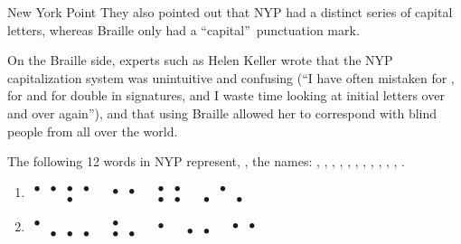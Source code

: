 \begin{refsection}
\begin{problem}{New York Point}{\namePLittell}{}
\noindent They also pointed out that NYP had a distinct series of capital letters, whereas Braille only had a “capital”\ punctuation mark. 

On the Braille side, experts such as Helen Keller wrote that the NYP capitalization system was unintuitive and confusing (“I have often mistaken  for ,  for  and  for double  in signatures, and I waste time looking at initial letters over and over again”), and that using Braille allowed her to correspond with blind people from all over the world.

The following 12 words in NYP represent, \OlympiadRandomOrder{}, the names: , , , , , , , , , , , . \\

\begin{multicols}{2}
\begin{enumerate}
    \item {\Large \boldmath$\begin{smallmatrix} 
    \bullet & \bullet & \bullet & \bullet \\  & & \bullet &
\end{smallmatrix}$\ \ $\begin{smallmatrix}
  \bullet & \bullet \\  & 
\end{smallmatrix}$\ \ $\begin{smallmatrix}
  \bullet & \bullet \\ \bullet & \bullet
\end{smallmatrix}$\ \ $\begin{smallmatrix}
  & \bullet &  \\ \bullet& & \bullet
\end{smallmatrix}$}

    \item {\Large \boldmath$\begin{smallmatrix} 
    \bullet &  &  &  \\  &\bullet&\bullet & \bullet 
\end{smallmatrix}$\ \ $\begin{smallmatrix}
  \bullet &  \\  \bullet& \bullet
\end{smallmatrix}$\ \ $\begin{smallmatrix}
  \bullet  \\ \,
\end{smallmatrix}$\ \ $\begin{smallmatrix}
  & \\ \bullet & \bullet
\end{smallmatrix}$\ \ $\begin{smallmatrix}
  \bullet & \bullet  \\ & 
\end{smallmatrix}$}


\end{enumerate}
\end{multicols}
\end{problem}
\end{refsection}
